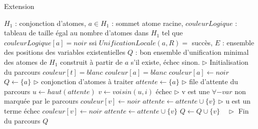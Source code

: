 \begin{center}
\begin{algorithm}[H]
\caption{Extension}\label{algo_extension}
\begin{algorithmic}[1]
\REQUIRE	$H_{1}$ : conjonction d'atomes, 
			$a \in H_{1}$ : sommet atome racine, 
			$couleurLogique$ : tableau de taille \'egal au nombre d'atomes dans $H_{1}$ tel que $couleurLogique[a] = noir$ ssi $UnificationLocale(a,R) =$ succ\`es, 
			$E$ : ensemble des positions des variables existentielles
\ENSURE $Q$ : bon ensemble d'unification minimal des atomes de ${H_1}$ construit \`a partir de $a$ s'il existe, \'echec sinon.
\STATE $\triangleright$ Initialisation du parcours
{}
			\STATE $couleur[t] = blanc$
		\ENDFOR
		\STATE $couleur[a] = blanc$
	\ENDIF
\ENDFOR
\STATE $couleur[a] \leftarrow noir$
\STATE $Q \leftarrow \{a\}$   $\triangleright$ conjonction d'atomes \`a traiter
\STATE $attente \leftarrow \{a\}$   $\triangleright$ file d'attente du parcours
	\STATE $u \leftarrow haut(attente)$
			\STATE $v \leftarrow voisin(u,i)$
				\RETURN \'echec	
				\STATE $\triangleright$ v est une $\forall-var$ non marqu\'ee par le parcours
				\STATE $couleur[v] \leftarrow noir$
				\STATE $attente \leftarrow attente \cup \{v\}$
			\ENDIF
		\ENDFOR
	\ELSE
		\STATE $\triangleright$ u est un terme
				\RETURN \'echec
			\ELSE
					\STATE $couleur[v] \leftarrow noir$
					\STATE $attente \leftarrow attente \cup \{v\}$
					\STATE $Q \leftarrow Q \cup \{v\}$
				\ENDIF
			\ENDIF
		\ENDFOR
	\ENDIF
\ENDWHILE $\ \ \ \triangleright$ Fin du parcours
\RETURN $Q$
\end{algorithmic}
\end{algorithm}
\end{center}

